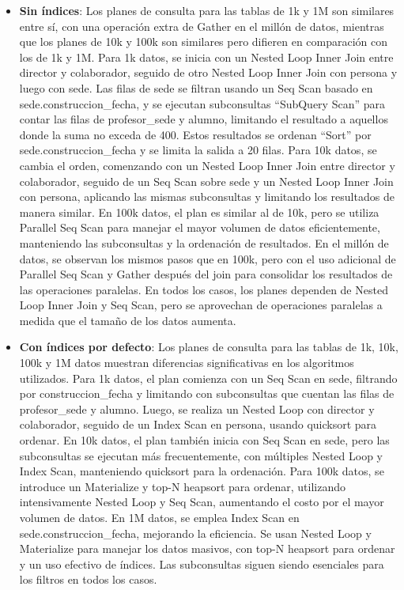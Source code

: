 \begin{itemize}
\begin{itemize}
            \item {\textbf{Sin índices}: Los planes de consulta para las tablas de 1k y 1M son similares entre sí, con una operación extra de Gather en el millón de datos, mientras que los planes de 10k y 100k son similares pero difieren en comparación con los de 1k y 1M. Para 1k datos, se inicia con un Nested Loop Inner Join entre director y colaborador, seguido de otro Nested Loop Inner Join con persona y luego con sede. Las filas de sede se filtran usando un Seq Scan basado en sede.construccion\_fecha, y se ejecutan subconsultas ``SubQuery Scan'' para contar las filas de profesor\_sede y alumno, limitando el resultado a aquellos donde la suma no exceda de 400. Estos resultados se ordenan ``Sort'' por sede.construccion\_fecha y se limita la salida a 20 filas. Para 10k datos, se cambia el orden, comenzando con un Nested Loop Inner Join entre director y colaborador, seguido de un Seq Scan sobre sede y un Nested Loop Inner Join con persona, aplicando las mismas subconsultas y limitando los resultados de manera similar. En 100k datos, el plan es similar al de 10k, pero se utiliza Parallel Seq Scan para manejar el mayor volumen de datos eficientemente, manteniendo las subconsultas y la ordenación de resultados. En el millón de datos, se observan los mismos pasos que en 100k, pero con el uso adicional de Parallel Seq Scan y Gather después del join para consolidar los resultados de las operaciones paralelas. En todos los casos, los planes dependen de Nested Loop Inner Join y Seq Scan, pero se aprovechan de operaciones paralelas a medida que el tamaño de los datos aumenta.}
            \item {\textbf{Con índices por defecto}: Los planes de consulta para las tablas de 1k, 10k, 100k y 1M datos muestran diferencias significativas en los algoritmos utilizados. Para 1k datos, el plan comienza con un Seq Scan en sede, filtrando por construccion\_fecha y limitando con subconsultas que cuentan las filas de profesor\_sede y alumno. Luego, se realiza un Nested Loop con director y colaborador, seguido de un Index Scan en persona, usando quicksort para ordenar. En 10k datos, el plan también inicia con Seq Scan en sede, pero las subconsultas se ejecutan más frecuentemente, con múltiples Nested Loop y Index Scan, manteniendo quicksort para la ordenación. Para 100k datos, se introduce un Materialize y top-N heapsort para ordenar, utilizando intensivamente Nested Loop y Seq Scan, aumentando el costo por el mayor volumen de datos. En 1M datos, se emplea Index Scan en sede.construccion\_fecha, mejorando la eficiencia. Se usan Nested Loop y Materialize para manejar los datos masivos, con top-N heapsort para ordenar y un uso efectivo de índices. Las subconsultas siguen siendo esenciales para los filtros en todos los casos.}

\end{itemize}
\end{itemize}
